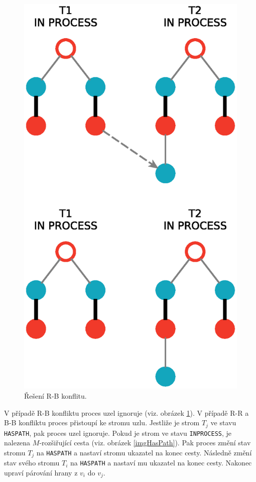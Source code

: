 \documentclass[a4paper, 11pt, titlepage, final]{article}[3. prosinec 2011]
\begin{document}
\begin{figure}[ht]
  \centering
  \includegraphics[scale=0.5]{img/inconflict.eps}
  \caption{Řešení R-B konflitu.}
  \label{imgConflict}
\end{figure}

V případě R-B konfliktu proces uzel ignoruje (viz. obrázek \ref{imgConflict}). V případě R-R a B-B konfliktu proces přistoupí ke stromu uzlu. Jestliže je strom $T_j$ ve stavu \texttt{HASPATH}, pak proces uzel ignoruje. Pokud je strom ve stavu \texttt{INPROCESS}, je nalezena $M$-rozšiřující cesta (viz. obrázek \ref{imgHasPath}). Pak proces změní stav stromu $T_j$ na \texttt{HASPATH} a nastaví stromu ukazatel na konec cesty. Následně změní stav svého stromu $T_i$ na \texttt{HASPATH} a nastaví mu ukazatel na konec cesty. Nakonec upraví párování hrany z $v_i$ do $v_j$.
\end{document}
